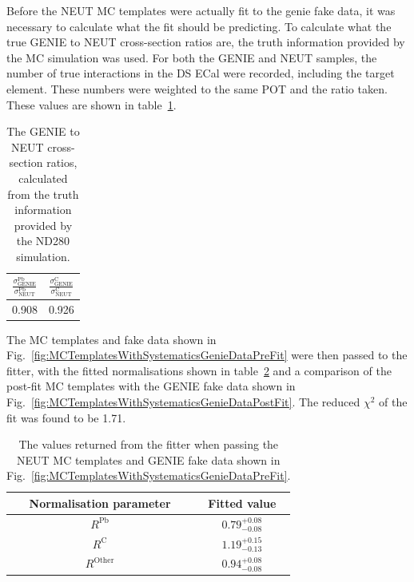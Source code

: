 \newline
\newline
Before the NEUT MC templates were actually fit to the genie fake data, it was necessary to calculate what the fit should be predicting.  To calculate what the true GENIE to NEUT cross-section ratios are, the truth information provided by the MC simulation was used.  For both the GENIE and NEUT samples, the number of true interactions in the DS ECal were recorded, including the target element.  These numbers were weighted to the same POT and the ratio taken.  These values are shown in table~\ref{table:GENIEToNEUTTrueCrossSectioRatio}.  
\begin{table}
  \begin{tabular}{c c }
    $\frac{\sigma^{\textrm{Pb}}_{\textrm{GENIE}}}{\sigma^{\textrm{Pb}}_{\textrm{NEUT}}}$ &$\frac{\sigma^{\textrm{C}}_{\textrm{GENIE}}}{\sigma^{\textrm{C}}_{\textrm{NEUT}}}$\\ \hline \hline
    0.908 & 0.926  \\
  \end{tabular}
  \caption{The GENIE to NEUT cross-section ratios, calculated from the truth information provided by the ND280 simulation.}
  \label{table:GENIEToNEUTTrueCrossSectioRatio}
\end{table}
\newline
\newline
The MC templates and fake data shown in Fig.~\ref{fig:MCTemplatesWithSystematicsGenieDataPreFit} were then passed to the fitter, with the fitted normalisations shown in table~\ref{table:NEUTMCTemplatesGENIEDataPostFit} and a comparison of the post-fit MC templates with the GENIE fake data shown in Fig.~\ref{fig:MCTemplatesWithSystematicsGenieDataPostFit}.  The reduced $\chi^2$ of the fit was found to be 1.71.  
\begin{table}[b!]
  \begin{tabular}{c c }
    Normalisation parameter & Fitted value \\ \hline \hline
    $R^{\textrm{Pb}}$ & $0.79^{+0.08}_{-0.08}$  \\
    $R^{\textrm{C}}$ & $1.19^{+0.15}_{-0.13}$  \\
    $R^{\textrm{Other}}$ & $0.94^{+0.08}_{-0.08}$  \\
  \end{tabular}
  \caption{The values returned from the fitter when passing the NEUT MC templates and GENIE fake data shown in Fig.~\ref{fig:MCTemplatesWithSystematicsGenieDataPreFit}.}
  \label{table:NEUTMCTemplatesGENIEDataPostFit}
\end{table}
